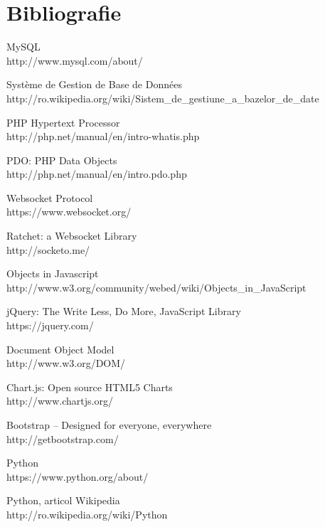 \documentclass[12pt,a4paper]{article}
\begin{document}
\section{Bibliografie}
\begingroup
\renewcommand{\section}[2]{}%
\begin{thebibliography}{99}

	MySQL \\
	http://www.mysql.com/about/
	
	Système de Gestion de Base de Données\\
	http://ro.wikipedia.org/wiki/Sistem\_de\_gestiune\_a\_bazelor\_de\_date

	PHP Hypertext Processor\\
	http://php.net/manual/en/intro-whatis.php

	PDO: PHP Data Objects\\
	http://php.net/manual/en/intro.pdo.php
	
	Websocket Protocol\\
	https://www.websocket.org/
	
	Ratchet: a Websocket Library\\
	http://socketo.me/
	
	Objects  in Javascript\\
	http://www.w3.org/community/webed/wiki/Objects\_in\_JavaScript
	
	jQuery: The Write Less, Do More, JavaScript Library\\
	https://jquery.com/
	
	Document Object Model\\
	http://www.w3.org/DOM/

	Chart.js: Open source HTML5 Charts \\
	http://www.chartjs.org/
	
	Bootstrap -- Designed for everyone, everywhere \\
	http://getbootstrap.com/
	
	Python \\
	https://www.python.org/about/

	Python, articol Wikipedia\\
	http://ro.wikipedia.org/wiki/Python
	

\end{thebibliography}
\end{document}
